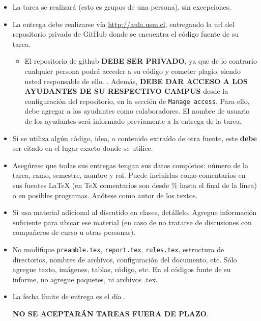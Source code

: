 
  \begin{itemize}
  \item
    La tarea se realizará 
    (esto es grupos de una persona),
    sin excepciones.
  \item
    La entrega debe realizarse vía \url{http://aula.usm.cl}, entregando la url del repositorio privado de GitHub donde se encuentra el código fuente de su tarea.
  \begin{itemize}
      
  \item El repositorio de github \textbf{DEBE SER PRIVADO}, ya que de lo contrario cualquier persona podrá acceder a su código y cometer plagio, siendo usted responsable de ello. 
  . Además, \textbf{DEBE DAR ACCESO A LOS AYUDANTES DE SU RESPECTIVO CAMPUS} desde la configuración del repositorio, en la sección de \texttt{Manage access}. Para ello, debe agregar a los ayudantes como colaboradores. El nombre de usuario de los ayudantes será informado previamente a la entrega de la tarea.
  \end{itemize}

  \item Si se utiliza algún código, idea, o contenido extraído de otra fuente, este \textbf{debe} ser citado en el lugar exacto donde se utilice. 
  \item
  Asegúrese que todas sus entregas tengan sus datos completos:
  número de la tarea, ramo, semestre, nombre y rol.
  Puede incluirlas como comentarios en sus fuentes \LaTeX{}
  (en \TeX{} comentarios son desde \% hasta el final de la línea)
  o en posibles programas.
  Anótese como autor de los textos.

  \item
    Si usa material adicional al discutido en clases,
    detállelo.
    Agregue información suficiente para ubicar ese material
    (en caso de no tratarse de discusiones con compañeros de curso
     u otras personas).
    \item No modifique \texttt{preamble.tex}, \texttt{report.tex}, \texttt{rules.tex}, estructura de directorios, nombres de archivos, configuración del documento, etc. Sólo agregue texto, imágenes, tablas, código, etc. En el códigos funte de su informe, no agregue paquetes, ni archivos .tex.

  \item

    La fecha límite de entrega es el día \tcm{\deadline}.

    \begin{center}
        \Large{
          \textbf{NO SE ACEPTARÁN TAREAS FUERA DE PLAZO}.
        }
        \normalsize
    \end{center}
     

\end{itemize}
